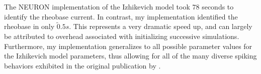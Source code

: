 
        
The NEURON implementation of the Izhikevich model took $78$ seconds to identify the rheobase current.
In contrast, my implementation identified the rheobase in only $\tilde 0.5 s$.
This represents a very dramatic speed up, and can largely be attributed to overhead associated with initializing successive simulations.
Furthermore, my implementation generalizes to all possible parameter values for the Izhikevich model parameters, thus allowing for all of the many diverse spiking behaviors exhibited in the original publication by \cite{izhikevich2003simple}.

        


